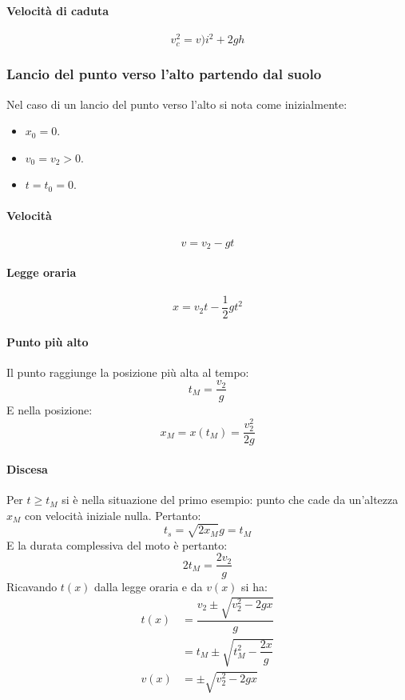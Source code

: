 			\paragraph{Velocit\`a di caduta}
			$$v_c^2=v)i^2+2gh$$

		\subsubsection{Lancio del punto verso l'alto partendo dal suolo}
		Nel caso di un lancio del punto verso l'alto si nota come inizialmente:
		\begin{multicols}{3}
			\begin{itemize}
				\item $x_0=0$.
				\item $v_0 = v_2 > 0$.
				\item $t=t_0=0$.
			\end{itemize}
		\end{multicols}

			\paragraph{Velocit\`a}
			$$v=v_2 - gt$$

			\paragraph{Legge oraria}
			$$x = v_2t-\dfrac{1}{2}gt^2$$

			\paragraph{Punto pi\`u alto}
			Il punto raggiunge la posizione pi\`u alta al tempo:
			$$t_M = \dfrac{v_2}{g}$$
			E nella posizione:
			$$x_M=x(t_M)=\dfrac{v_2^2}{2g}$$

			\paragraph{Discesa}
			Per $t\ge t_M$ si \`e nella situazione del primo esempio: punto che cade da un'altezza $x_M$ con velocit\`a iniziale nulla.
			Pertanto:
			$$t_s = \sqrt{2x_M}{g}=t_M$$
			E la durata complessiva del moto \`e pertanto:
			$$2t_M = \dfrac{2v_2}{g}$$
			Ricavando $t(x)$ dalla legge oraria e da $v(x)$ si ha:
			\begin{align*}
				t(x) &= \dfrac{v_2\pm \sqrt{v_2^2 - 2gx}}{g}\\
				     &= t_M \pm \sqrt{t_M^2 - \dfrac{2x}{g}}\\
				v(x) &= \pm \sqrt{v_2^2 - 2gx}
			\end{align*}

